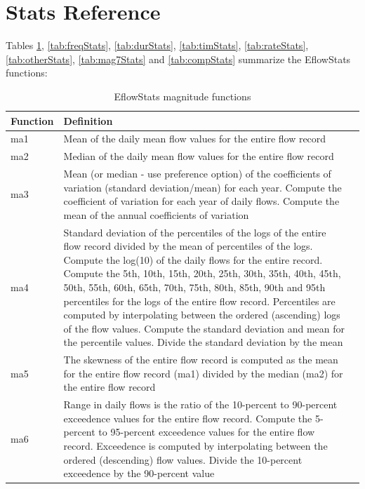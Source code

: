 \documentclass[a4paper,11pt]{article}\usepackage[]{graphicx}\usepackage[]{color}
\begin{document}
\section{Stats Reference}
\label{sec:reference}

Tables \ref{tab:magStats}, \ref{tab:freqStats}, \ref{tab:durStats}, \ref{tab:timStats}, \ref{tab:rateStats}, \ref{tab:otherStats}, \ref{tab:mag7Stats} and \ref{tab:compStats} summarize the EflowStats functions:

\begin{table}[ht]
  \centering
  \begin{threeparttable}[b]
  \caption{EflowStats magnitude functions}
  \label{tab:magStats}
  \begin{tabularx}{\textwidth}{lXl}
  \hline
\textbf{Function} & \textbf{Definition} \\ 
  \hline
  ma1 & Mean of the daily mean flow values for the entire flow record \\
  ma2 & Median of the daily mean flow values for the entire flow record \\
  ma3 & Mean (or median - use preference option) of the coefficients of 
  variation (standard deviation/mean) for each year. Compute the coefficient 
  of variation for each year of daily flows. Compute the mean of the annual 
  coefficients of variation \\
  ma4 & Standard deviation of the percentiles of the logs of the entire flow record divided by the mean of percentiles of the logs. Compute the log(10) of the daily flows for the entire record. Compute the 5th, 10th, 15th, 20th, 25th, 30th, 35th, 40th, 45th, 50th, 55th, 60th, 65th, 70th, 75th, 80th, 85th, 90th and 95th percentiles for the logs of the entire flow record. Percentiles are computed by interpolating between the ordered (ascending) logs of the flow values. Compute the standard deviation and mean for the percentile values. Divide the standard deviation by the mean \\
  ma5 & The skewness of the entire flow record is computed as the mean for the entire flow record (ma1) divided by the median (ma2) for the entire flow record \\
  ma6 & Range in daily flows is the ratio of the 10-percent to 90-percent exceedence values for the entire flow record. Compute the 5-percent to 95-percent exceedence values for the entire flow record. Exceedence is computed by interpolating between the ordered (descending) flow values. Divide the 10-percent exceedence by the 90-percent value \\

\end{tabularx}
\end{threeparttable}
\end{table}
\end{document}
